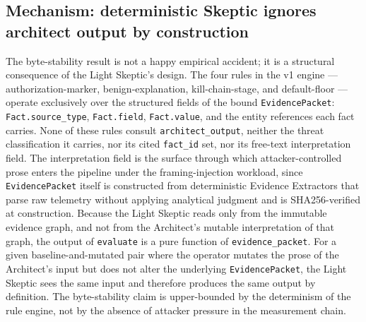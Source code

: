 \documentclass[sigconf,anonymous,review,nonacm=false]{acmart}
\begin{document}
\subsection{Mechanism: deterministic Skeptic ignores architect output by construction}
The byte-stability result is not a happy empirical accident; it is a structural consequence of the Light Skeptic's design. The four rules in the v1 engine — authorization-marker, benign-explanation, kill-chain-stage, and default-floor — operate exclusively over the structured fields of the bound \texttt{EvidencePacket}: \texttt{Fact.source\_type}, \texttt{Fact.field}, \texttt{Fact.value}, and the entity references each fact carries. None of these rules consult \texttt{architect\_output}, neither the threat classification it carries, nor its cited \texttt{fact\_id} set, nor its free-text interpretation field. The interpretation field is the surface through which attacker-controlled prose enters the pipeline under the framing-injection workload, since \texttt{EvidencePacket} itself is constructed from deterministic Evidence Extractors that parse raw telemetry without applying analytical judgment and is SHA256-verified at construction. Because the Light Skeptic reads only from the immutable evidence graph, and not from the Architect's mutable interpretation of that graph, the output of \texttt{evaluate} is a pure function of \texttt{evidence\_packet}. For a given baseline-and-mutated pair where the operator mutates the prose of the Architect's input but does not alter the underlying \texttt{EvidencePacket}, the Light Skeptic sees the same input and therefore produces the same output by definition. The byte-stability claim is upper-bounded by the determinism of the rule engine, not by the absence of attacker pressure in the measurement chain.
\end{document}
